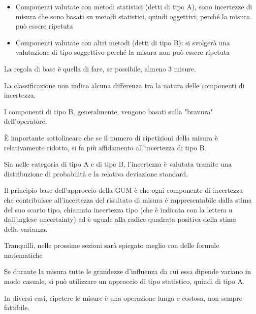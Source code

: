 \begin{itemize}
    \item Componenti valutate con metodi statistici (detti di tipo A), sono incertezze di misura che sono basati su metodi statistici, quindi oggettivi, perché la misura può essere ripetuta 
    \item Componenti valutate con altri metodi (detti di tipo B): si svolgerà una valutazione di tipo soggettivo perché la misura non può essere ripetuta
\end{itemize}

La regola di base è quella di fare, se possibile, almeno 3 misure. \newline 

La classificazione non indica alcuna differenza tra la natura delle componenti di incertezza. \newline 

I componenti di tipo B, generalmente, vengono basati sulla "bravura" dell'operatore. \newline 

È importante sottolineare che se il numero di ripetizioni della misura è relativamente ridotto, si fa più affidamento all'incertezza di tipo B. \newline 

Sia nelle categoria di tipo A e di tipo B, l'incertezza è valutata tramite una distribuzione di probabilità e la relativa deviazione standard. \newline 

Il principio base dell'approccio della GUM è che ogni componente di incertezza che contribuisce all'incertezza 
del risultato di misura è rappresentabile dalla stima del suo scarto tipo, 
chiamata incertezza tipo (che è indicata con la lettera u dall'inglese uncertainty) ed è uguale alla radice quadrata positiva della stima della varianza. 

\begin{tcolorbox}
    Tranquilli, nelle prossime sezioni sarà spiegato meglio con delle formule matematiche
\end{tcolorbox}

Se durante la misura tutte le grandezze d'influenza da cui essa dipende variano in modo casuale, 
si può utilizzare un approccio di tipo statistico, quindi di tipo A. \newline 

In diversi casi, ripetere le misure è una operazione lunga e costosa, non sempre fattibile. \newline 

